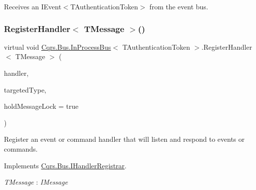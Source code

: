 Receives an I\+Event$<$\+T\+Authentication\+Token$>$ from the event bus. 

\mbox{\label{classCqrs_1_1Bus_1_1InProcessBus_aa14a00defdf2d48b2d0e6a65dbdb12d9}} 
\subsubsection{\texorpdfstring{Register\+Handler$<$ T\+Message $>$()}{RegisterHandler< TMessage >()}\hspace{0.1cm}{\footnotesize\ttfamily [1/2]}}
{\footnotesize\ttfamily virtual void \hyperlink{classCqrs_1_1Bus_1_1InProcessBus}{Cqrs.\+Bus.\+In\+Process\+Bus}$<$ T\+Authentication\+Token $>$.Register\+Handler$<$ T\+Message $>$ (\begin{DoxyParamCaption}\item[{Action$<$ T\+Message $>$}]{handler,  }\item[{Type}]{targeted\+Type,  }\item[{bool}]{hold\+Message\+Lock = {\ttfamily true} }\end{DoxyParamCaption})\hspace{0.3cm}{\ttfamily [virtual]}}



Register an event or command handler that will listen and respond to events or commands. 



Implements \hyperlink{interfaceCqrs_1_1Bus_1_1IHandlerRegistrar_ab6ca4dfdc54a5aeebe4651dbdb479f55}{Cqrs.\+Bus.\+I\+Handler\+Registrar}.

\begin{Desc}
\item[Type Constraints]\begin{description}
\item[{\em T\+Message} : {\em I\+Message}]\end{description}
\end{Desc}
\mbox{\label{classCqrs_1_1Bus_1_1InProcessBus_a62171e3c6d155cfdfd921b07b4909adf}} 
